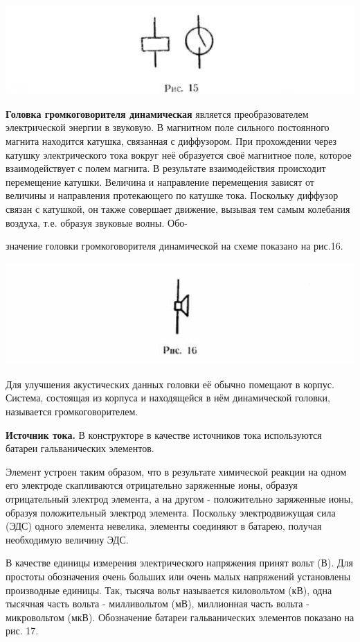 \documentclass[12pt]{article}
\begin{document}
\includegraphics[scale=0.85]{ekon3_012_2}

\textbf{Головка громкоговорителя динамическая} является преобразователем электрической энергии в звуковую. В магнитном поле сильного постоянного магнита находится катушка, связанная с диффузором. При прохождении через катушку электрического тока вокруг неё образуется своё магнитное поле, которое взаимодействует с полем магнита. В результате взаимодействия происходит перемещение катушки. Величина и направление перемещения зависят от величины и направления протекающего по катушке тока. Поскольку диффузор связан с катушкой, он также совершает движение, вызывая тем самым колебания воздуха, т.е. образуя звуковые волны. Обо-
\newpage

значение головки громкоговорителя динамической на схеме показано на рис.16.

\includegraphics[width=\textwidth]{ekon3_014_1}

Для улучшения акустических данных головки её обычно помещают в корпус. Система, состоящая из корпуса и находящейся в нём динамической головки, называется громкоговорителем.

\textbf{Источник тока.} В конструкторе в качестве источников тока используются батареи гальванических элементов.

Элемент устроен таким образом, что в результате химической реакции на одном его электроде скапливаются отрицательно заряженные ионы, образуя отрицательный электрод элемента, а на другом - положительно заряженные ионы, образуя положительный электрод элемента. Поскольку электродвижущая сила (ЭДС) одного элемента невелика, элементы соединяют в батарею, получая необходимую величину ЭДС.

В качестве единицы измерения электрического напряжения принят вольт (В). Для простоты обозначения очень больших или очень малых напряжений установлены производные единицы. Так, тысяча вольт называется киловольтом (кВ), одна тысячная часть вольта - милливольтом (мВ), миллионная часть вольта - микровольтом (мкВ). Обозначение батареи гальванических элементов показано на рис. 17.
\end{document}
